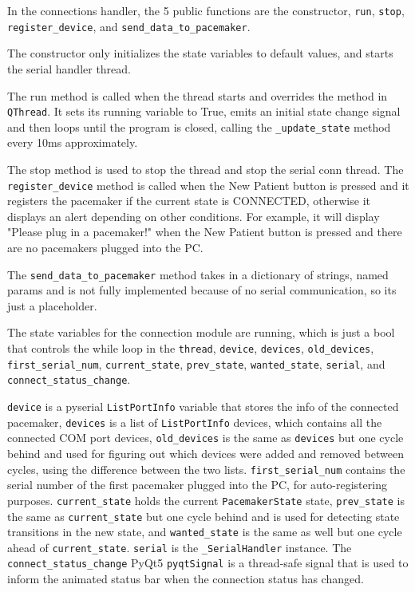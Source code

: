 \documentclass[12pt]{article}
\begin{document}
In the connections handler, the 5 public functions are the constructor, \verb|run|, \verb|stop|, \\ \verb|register_device|, and \verb|send_data_to_pacemaker|. 

The constructor only initializes the state variables to default values, and starts the serial handler thread.

The run method is called when the thread starts and overrides the method in \verb|QThread|. It sets its running variable to True, emits an initial state change signal and then loops until the program is closed, calling the \verb|_update_state| method every 10ms approximately.

The stop method is used to stop the thread and stop the serial conn thread.
The \\ \verb|register_device| method is called when the New Patient button is pressed and it registers the pacemaker if the current state is CONNECTED, otherwise it displays an alert depending on other conditions.
For example, it will display "Please plug in a pacemaker!" when the New Patient button is pressed and there are no pacemakers plugged into the PC.

The \verb|send_data_to_pacemaker| method takes in a dictionary of strings, named params and is not fully implemented because of no serial communication, so its just a placeholder.

The state variables for the connection module are running, which is just a bool that controls the while loop in the \verb|thread|, \verb|device|, \verb|devices|, \verb|old_devices|, \verb|first_serial_num|, \verb|current_state|, \verb|prev_state|, \verb|wanted_state|, \verb|serial|, and \verb|connect_status_change|.

\verb|device| is a pyserial \verb|ListPortInfo| variable that stores the info of the connected pacemaker, \verb|devices| is a list of \verb|ListPortInfo| devices, which contains all the connected COM port devices, \verb|old_devices| is the same as \verb|devices| but one cycle behind and used for figuring out which devices were added and removed between cycles, using the difference between the two lists. \verb|first_serial_num| contains the serial number of the first pacemaker plugged into the PC, for auto-registering purposes. \verb|current_state| holds the current \verb|PacemakerState| state, \verb|prev_state| is the same as \verb|current_state| but one cycle behind and is used for detecting state transitions in the new state, and \verb|wanted_state| is the same as well but one cycle ahead of \verb|current_state|. \verb|serial| is the \verb|_SerialHandler| instance. The \verb|connect_status_change| PyQt5 \verb|pyqtSignal| is a thread-safe signal that is used to inform the animated status bar when the connection status has changed. 
\end{document}
